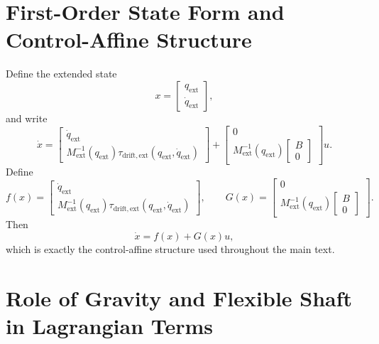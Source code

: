 \documentclass[12pt]{article}
\begin{document}
\section{First-Order State Form and Control-Affine Structure}

Define the extended state
\begin{equation}
x = 
\begin{bmatrix}
q_{\mathrm{ext}} \\
\dot{q}_{\mathrm{ext}}
\end{bmatrix},
\end{equation}
and write
\begin{equation}
\dot{x} =
\begin{bmatrix}
\dot{q}_{\mathrm{ext}} \\
M_{\mathrm{ext}}^{-1}(q_{\mathrm{ext}})
\tau_{\mathrm{drift,ext}}(q_{\mathrm{ext}},\dot{q}_{\mathrm{ext}})
\end{bmatrix}
+
\begin{bmatrix}
0 \\
M_{\mathrm{ext}}^{-1}(q_{\mathrm{ext}})
\begin{bmatrix} B \\ 0 \end{bmatrix}
\end{bmatrix} u.
\end{equation}
Define
\begin{equation}
f(x) =
\begin{bmatrix}
\dot{q}_{\mathrm{ext}} \\
M_{\mathrm{ext}}^{-1}(q_{\mathrm{ext}})
\tau_{\mathrm{drift,ext}}(q_{\mathrm{ext}},\dot{q}_{\mathrm{ext}})
\end{bmatrix},
\qquad
G(x) =
\begin{bmatrix}
0 \\
M_{\mathrm{ext}}^{-1}(q_{\mathrm{ext}})
\begin{bmatrix} B \\ 0 \end{bmatrix}
\end{bmatrix}.
\end{equation}
Then
\begin{equation}
\dot{x} = f(x) + G(x)u,
\end{equation}
which is exactly the control-affine structure used throughout the main text.

\section{Role of Gravity and Flexible Shaft in Lagrangian Terms}
\end{document}
